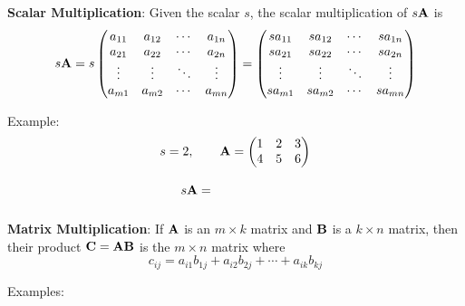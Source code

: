 \documentclass[]{book}
\theoremstyle{definition}
\theoremstyle{definition}
\theoremstyle{definition}
\theoremstyle{remark}
\begin{document}
\textbf{Scalar Multiplication}: Given the scalar \(s\), the scalar
multiplication of \(s {\bf A}\) is \[ s {\bf A}=  s \begin{pmatrix}
            a_{11} & a_{12} & \cdots & a_{1n} \\
            a_{21} & a_{22} & \cdots & a_{2n} \\
            \vdots & \vdots & \ddots & \vdots \\
            a_{m1} & a_{m2} & \cdots & a_{mn}
        \end{pmatrix}
        = \begin{pmatrix}
            s a_{11} & s a_{12} & \cdots & s a_{1n} \\
            s a_{21} & s a_{22} & \cdots & s a_{2n} \\
            \vdots & \vdots & \ddots & \vdots \\
            s a_{m1} & s a_{m2} & \cdots & s a_{mn}
        \end{pmatrix}\]

Example:
\[s=2, \qquad {\bf A}=\begin{pmatrix} 1 & 2 & 3 \\ 4 & 5 & 6 \end{pmatrix}\]
\[s {\bf A} = \phantom{\begin{pmatrix} 2 & 4 & 6 \\ 8 & 10 & 12 \end{pmatrix}}\]

\textbf{Matrix Multiplication}: If \({\bf A}\) is an \(m\times k\)
matrix and \(\bf B\) is a \(k\times n\) matrix, then their product
\(\bf C = A B\) is the \(m\times n\) matrix where
\[c_{ij}=a_{i1}b_{1j}+a_{i2}b_{2j}+\cdots+a_{ik}b_{kj}\]

Examples:
\end{document}
